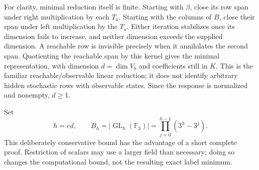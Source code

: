 For clarity, minimal reduction itself is finite. Starting with $\beta$,
close its row span under right multiplication by each $T_a$. Starting with
the columns of $B$, close their span under left multiplication by the
$T_a$. Either iteration stabilizes once its dimension fails to increase,
and neither dimension exceeds the supplied dimension. A reachable row is
invisible precisely when it annihilates the second span. Quotienting the
reachable span by this kernel gives the minimal representation, with
dimension $d=\dim V_b$ and coefficients still in $K$. This is the familiar
reachable/observable linear reduction; it does not identify arbitrary
hidden stochastic rows with observable states. Since the response is
normalized and nonempty, $d\ge1$.

Set
\begin{equation}\label{eq:r73-group-budget}
 h=ed,\qquad
 B_h=|\operatorname{GL}_h(\mathbb F_3)|
     =\prod_{j=0}^{h-1}(3^h-3^j).
\end{equation}
This deliberately conservative bound has the advantage of a short complete
proof. Restriction of scalars may use a larger field than necessary; doing
so changes the computational bound, not the resulting exact label minimum.

